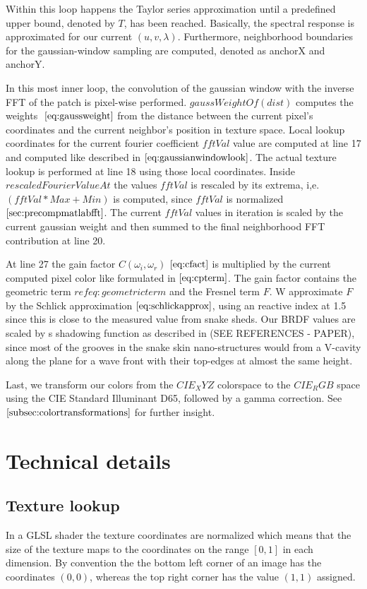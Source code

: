 Within this loop happens the Taylor series approximation until a predefined upper bound, denoted by $T$, has been reached.
Basically, the spectral response is approximated for our current $(u,v,\lambda)$. Furthermore, neighborhood boundaries for the gaussian-window sampling are computed, denoted as anchorX and anchorY.

In this most inner loop, the convolution of the gaussian window with the inverse FFT of the patch is pixel-wise performed. 
$gaussWeightOf(dist)$ computes the weights $~\eqref{eq:gaussweight}$ from the distance between the current pixel's coordinates and the current neighbor's position in texture space. Local lookup coordinates for the current fourier coefficient $fftVal$ value are computed at line 17 and computed like described in $\ref{eq:gaussianwindowlook}$. The actual texture lookup is performed at line 18 using those local coordinates. Inside $rescaledFourierValueAt$ the values $fftVal$ is rescaled by its extrema, i,e. $(fftVal*Max + Min)$ is computed, since $fftVal$ is normalized $\ref{sec:precompmatlabfft}$. The current $fftVal$ values in iteration is scaled by the current gaussian weight and then summed to the final neighborhood FFT contribution at line 20.

At line 27 the gain factor $C(\omega_i, \omega_r)$  $\ref{eq:cfact}$ is multiplied by the current computed pixel color like formulated in $\ref{eq:cpterm}$. The gain factor contains the geometric term $ref{eq:geometricterm}$ and the Fresnel term $F$. W approximate $F$ by the Schlick approximation $\ref{eq:schlickapprox}$, using an reactive index at 1.5 since this is close to the measured value from snake sheds.
Our BRDF values are scaled by s shadowing function as described in (SEE REFERENCES - PAPER), since most of the grooves in the snake skin nano-structures would from a V-cavity along the plane for a wave front with their top-edges at almost the same height.

Last, we transform our colors from the $CIE_XYZ$ colorspace to the $CIE_RGB$ space using the CIE Standard Illuminant D65, followed by a gamma correction. See $\ref{subsec:colortransformations}$ for further insight.

\section{Technical details}
\subsection{Texture lookup}
In a GLSL shader the texture coordinates are normalized which means that the size of the texture maps to the coordinates on the range $[0,1]$ in each dimension. By convention the the bottom left corner of an image has the coordinates $(0,0)$, whereas the top right corner has the value $(1,1)$ assigned. 

